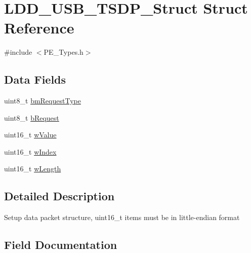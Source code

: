 \hypertarget{struct_l_d_d___u_s_b___t_s_d_p___struct}{}\section{L\+D\+D\+\_\+\+U\+S\+B\+\_\+\+T\+S\+D\+P\+\_\+\+Struct Struct Reference}
\label{struct_l_d_d___u_s_b___t_s_d_p___struct}


{\ttfamily \#include $<$P\+E\+\_\+\+Types.\+h$>$}

\subsection*{Data Fields}
\begin{DoxyCompactItemize}
\item 
uint8\+\_\+t \hyperlink{struct_l_d_d___u_s_b___t_s_d_p___struct_abea120ea756eb0abdb8aafb8713f61f4}{bm\+Request\+Type}
\item 
uint8\+\_\+t \hyperlink{struct_l_d_d___u_s_b___t_s_d_p___struct_a1e7be110861bd4ff75c86d5214f31543}{b\+Request}
\item 
uint16\+\_\+t \hyperlink{struct_l_d_d___u_s_b___t_s_d_p___struct_a7383d0165ad8eab48aa239c005199121}{w\+Value}
\item 
uint16\+\_\+t \hyperlink{struct_l_d_d___u_s_b___t_s_d_p___struct_adc578ce35d89d52deba61ee6f312f177}{w\+Index}
\item 
uint16\+\_\+t \hyperlink{struct_l_d_d___u_s_b___t_s_d_p___struct_a496c03443b177fd2e6c93616064d2934}{w\+Length}
\end{DoxyCompactItemize}


\subsection{Detailed Description}
Setup data packet structure, uint16\+\_\+t items must be in little-\/endian format 

\subsection{Field Documentation}
\mbox{\label{struct_l_d_d___u_s_b___t_s_d_p___struct_abea120ea756eb0abdb8aafb8713f61f4}} 
